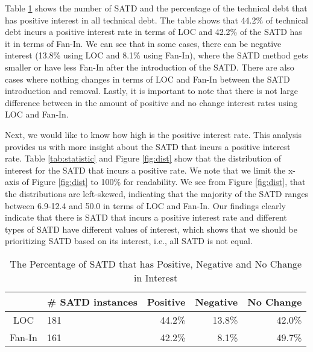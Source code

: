 
Table \ref{tab:percentage} shows the number of SATD and the percentage of the technical debt that has positive interest in all technical debt. The table shows that 44.2\% of technical debt incurs a positive interest rate in terms of LOC and 42.2\% of the SATD has it in terms of Fan-In. We can see that in some cases, there can be negative interest (13.8\% using LOC and 8.1\% using Fan-In), where the SATD method gets smaller or have less Fan-In after the introduction of the SATD. There are also cases where nothing changes in terms of LOC and Fan-In between the SATD introduction and removal. Lastly, it is important to note that there is not large difference between in the amount of positive and no change interest rates using LOC and Fan-In. 

Next, we would like to know how high is the positive interest rate. This analysis provides us with more insight about the SATD that incurs a positive interest rate.
Table \ref{tab:statistic} and Figure \ref{fig:dist} show that the distribution of interest for the SATD that incurs a positive rate. We note that we limit the x-axis of Figure \ref{fig:dist} to 100\% for readability. We see from Figure \ref{fig:dist}, that the distributions are left-skewed, indicating that the majority of the SATD ranges between 6.9-12.4 and 50.0 in terms of LOC and Fan-In. Our findings clearly indicate that there is SATD that incurs a positive interest rate and different types of SATD have different values of interest, which shows that we should be prioritizing SATD based on its interest, i.e., all SATD is not equal.



\begin{table}[tb]
  \caption{The Percentage of SATD that has Positive, Negative and No Change in Interest}
  \label{tab:percentage}
  \centering

  \begin{tabular}{c|p{0.45in}|rrr}
  \hline
        & \textbf{\# SATD instances} & \textbf{Positive} & \textbf{Negative} & \textbf{No Change} \\
  \hline
   LOC  & 181 &  44.2\%  &  13.8\% & 42.0\%\\
Fan-In  & 161 &  42.2\%  &  8.1\% & 49.7\%\\
  \hline
  \end{tabular}
\end{table}

